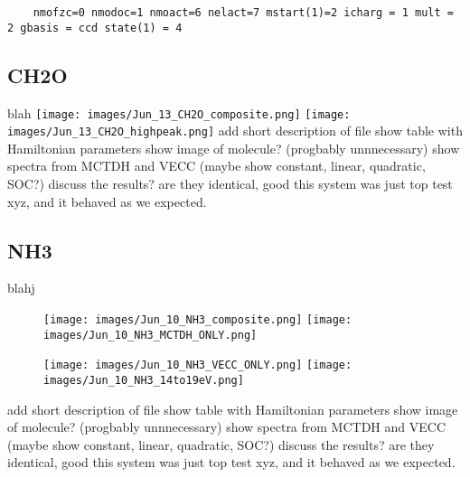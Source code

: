 \begin{lstlisting}
    nmofzc=0 nmodoc=1 nmoact=6 nelact=7 mstart(1)=2 icharg = 1 mult = 2 gbasis = ccd state(1) = 4
\end{lstlisting}



\subsection{CH2O}
blah
\texttt{[image: images/Jun\_13\_CH2O\_composite.png]}
\texttt{[image: images/Jun\_13\_CH2O\_highpeak.png]}
add short description of file
show table with Hamiltonian parameters
show image of molecule? (progbably unnnecessary)
show spectra from MCTDH and VECC (maybe show constant, linear, quadratic, SOC?)
discuss the results? are they identical, good this system was just top test xyz, and it behaved as we expected.

\subsection{NH3}
blahj
\begin{figure}[H]
    \center
    \texttt{[image: images/Jun\_10\_NH3\_composite.png]}
    \texttt{[image: images/Jun\_10\_NH3\_MCTDH\_ONLY.png]}
\end{figure}
\begin{figure}[H]
    \center
    \texttt{[image: images/Jun\_10\_NH3\_VECC\_ONLY.png]}
    \texttt{[image: images/Jun\_10\_NH3\_14to19eV.png]}
\end{figure}

add short description of file
show table with Hamiltonian parameters
show image of molecule? (progbably unnnecessary)
show spectra from MCTDH and VECC (maybe show constant, linear, quadratic, SOC?)
discuss the results? are they identical, good this system was just top test xyz, and it behaved as we expected.

